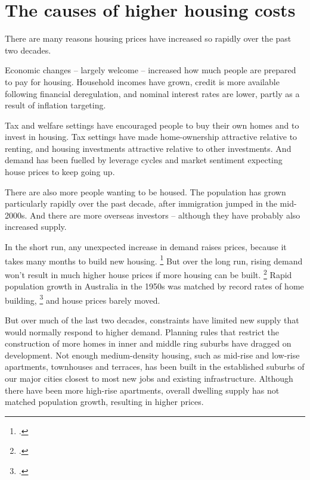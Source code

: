 \chapter{The causes of higher housing costs}\label{chap:the-causes-of-higher-housing-costs}

There are many reasons housing prices have increased so rapidly over the past two decades.

Economic changes -- largely welcome -- increased how much people are prepared to pay for housing.
Household incomes have grown, credit is more available following financial deregulation, and nominal interest rates are lower, partly as a result of inflation targeting.

Tax and welfare settings have encouraged people to buy their own homes and to invest in housing.
Tax settings have made home-ownership attractive relative to renting, and housing investments attractive relative to other investments.
And demand has been fuelled by leverage cycles and market sentiment expecting house prices to keep going up.

There are also more people wanting to be housed.
The population has grown particularly rapidly over the past decade, after immigration jumped in the mid-2000s.
And there are more overseas investors -- although they have probably also increased supply.

In the short run, any unexpected increase in demand raises prices, because it takes many months to build new housing.%
	\footcites{RBA2014SubmissionAffordableHousingInquiry}{RBAStatementonMonetaryPolicyFeb17}{HousingAus17}
But over the long run, rising demand won't result in much higher house prices if more housing can be built.%
	\footcites{RBA2014SubmissionAffordableHousingInquiry}[][4]{Glaeser-2013-Natio-of-gamblers}
Rapid population growth in Australia in the 1950s was matched by record rates of home building,%
    \footcite{Eslake2013}
and house prices barely moved.

But over much of the last two decades, constraints have limited new supply that would normally respond to higher demand. Planning rules that restrict the construction of more homes in inner and middle ring suburbs have dragged on development. Not enough medium-density housing, such as mid-rise and low-rise apartments, townhouses and terraces, has been built in the established suburbs of our major cities closest to most new jobs and existing infrastructure. Although there have been more high-rise apartments, overall dwelling supply has not matched population growth, resulting in higher prices.

